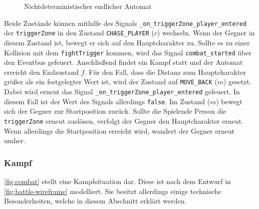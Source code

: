 \begin{figure}[H]
    \centering
    \caption{Nichtdeterministischer endlicher Automat}
    \label{fig:fsm}
\end{figure}

Beide Zustände können mithilfe des Signals \texttt{\_on\_triggerZone\_player\_entered} der \texttt{triggerZone} in den Zustand \texttt{CHASE\_PLAYER} ($c$) wechseln.
Wenn der Gegner in diesem Zustand ist, bewegt er sich auf den Hauptcharakter zu.
Sollte es zu einer Kollision mit dem \texttt{fightTrigger} kommen, wird das Signal \texttt{combat\_started} über den Eventbus gefeuert.
Anschließend findet ein Kampf statt und der Automat erreicht den Endzustand $f$.
Für den Fall, dass die Distanz zum Hauptcharakter größer als ein festgelegter Wert ist, wird der Zustand auf \texttt{MOVE\_BACK} ($m$) gesetzt.
Dabei wird erneut das Signal \texttt{\_on\_triggerZone\_player\_entered} gefeuert.
In diesem Fall ist der Wert des Signals allerdings \texttt{false}.
Im Zustand ($m$) bewegt sich der Gegner zur Startposition zurück.
Sollte die Spielende Person die \texttt{triggerZone} erneut auslösen, verfolgt der Gegner den Hauptcharakter erneut.
Wenn allerdings die Startposition erreicht wird, wandert der Gegner erneut umher.\\

\subsubsection{Kampf}
\autoref{fig:combat} stellt eine Kampfsituation dar.
Diese ist nach dem Entwurf in \autoref{fig:battle-wireframe} modelliert.
Sie besitzt allerdings einige technische Besonderheiten, welche in diesem Abschnitt erklärt werden.

